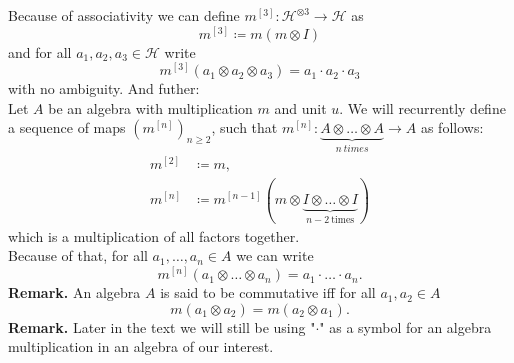 \documentclass[a4paper, 12pt]{article}
\begin{document}
\indent  Because of associativity we can define $m^{[3]} : \mathcal{H}^{\otimes 3} \to \mathcal{H}$ as
\begin{equation*}
m^{[3]} \coloneqq m(m\otimes I)
\end{equation*}
and for all $a_1, a_2, a_3 \in \mathcal{H}$ write
\begin{equation*}
m^{[3]}(a_1 \otimes a_2 \otimes a_3) = a_1 \cdot a_2 \cdot a_3
\end{equation*}
with no ambiguity.
And futher: \\
\indent Let $A$ be an algebra with multiplication $m$ and unit $u$. We will recurrently define a
sequence of maps
$(m^{[n]})_{n \geq 2}$, such that $m^{[n]} : \underbrace{A \otimes \dots \otimes A}_{n\ times} \to A$
as follows:
\begin{align*}
m^{[2]} &\coloneqq m, \\
m^{[n]} &\coloneqq m^{[n-1]}(m \otimes \underbrace{I \otimes \dots \otimes I}_{n-2 \mathrm{\ times}})
\end{align*}
which is a multiplication of all factors together. \\
Because of that, for all $a_1, \dots, a_n \in A$ we can write
\begin{equation*}
m^{[n]}(a_1 \otimes \dots \otimes a_n) = a_1 \cdot \ldots \cdot a_n.
\end{equation*}
\textbf{Remark. } An algebra $A$ is said to be commutative iff for all $a_1, a_2 \in A$
\begin{equation*}
m(a_1 \otimes a_2 ) = m(a_2 \otimes a_1).
\end{equation*}
\indent \textbf{Remark. } Later in the text we will still be using "$\cdot$" as a symbol for an algebra
multiplication in an algebra of our interest.
\end{document}
